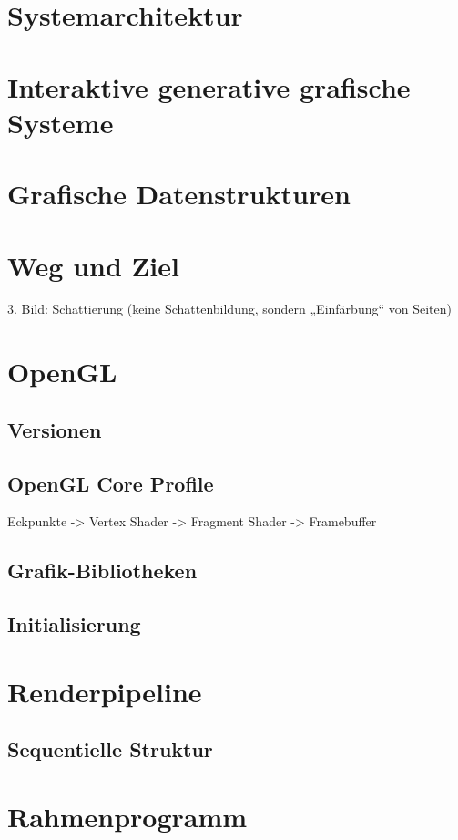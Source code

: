 \section{Systemarchitektur}
\section{Interaktive generative grafische Systeme}
\section{Grafische Datenstrukturen}
\section{Weg und Ziel}
3. Bild: Schattierung (keine Schattenbildung, sondern „Einfärbung“ von Seiten)

\section{OpenGL}
\subsection{Versionen}
\subsection{OpenGL Core Profile}
Eckpunkte -> Vertex Shader -> Fragment Shader -> Framebuffer
\subsection{Grafik-Bibliotheken}
\subsection{Initialisierung}

\section{Renderpipeline}
\subsection{Sequentielle Struktur}

\section{Rahmenprogramm}

